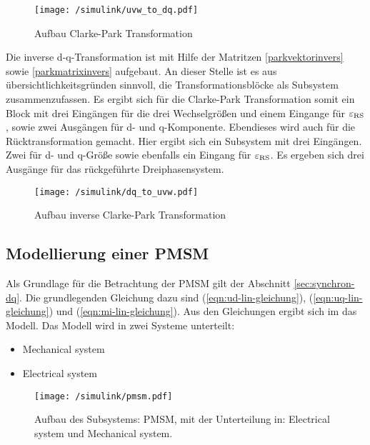 \begin{figure}[htb!]
	\centering
	\texttt{[image: /simulink/uvw\_to\_dq.pdf]}
	\label{fig:uvw_to_dq}
	\caption{Aufbau Clarke-Park Transformation}
\end{figure}

Die inverse d-q-Transformation ist mit Hilfe der Matritzen \ref{parkvektorinvers} sowie \ref{parkmatrixinvers} aufgebaut.
An dieser Stelle ist es aus übersichtlichkeitsgründen sinnvoll, die Transformationsblöcke als Subsystem zusammenzufassen.
Es ergibt sich für die Clarke-Park Transformation somit ein Block mit drei Eingängen für die drei Wechselgrößen und einem Eingange für $\varepsilon_{\mathrm{RS}}$, sowie zwei Ausgängen für d- und q-Komponente.
Ebendieses wird auch für die Rücktransformation gemacht. 
Hier ergibt sich ein Subsystem mit drei Eingängen. 
Zwei für d- und q-Größe sowie ebenfalls ein Eingang für $\varepsilon_{\mathrm{RS}}$.
Es ergeben sich drei Ausgänge für das rückgeführte Dreiphasensystem.

\begin{figure}[htb!]
	\centering
	\texttt{[image: /simulink/dq\_to\_uvw.pdf]}
	\label{fig:dq_to_uvw}
	\caption{Aufbau inverse Clarke-Park Transformation}
\end{figure}


\subsection{Modellierung einer PMSM}

Als Grundlage für die Betrachtung der PMSM gilt der Abschnitt \ref{sec:synchron-dq}.
Die grundlegenden Gleichung dazu sind (\ref{eqn:ud-lin-gleichung}), (\ref{eqn:uq-lin-gleichung}) und (\ref{eqn:mi-lin-gleichung}).
Aus den Gleichungen ergibt sich im  das Modell.
Das Modell wird in zwei Systeme unterteilt:

\begin{itemize}
	\item Mechanical system
	\item Electrical system
\end{itemize}

\begin{figure}[h!]
	\centering
	\texttt{[image: /simulink/pmsm.pdf]}
	\label{fig:pmsm}
	\caption{Aufbau des Subsystems: PMSM, mit der Unterteilung in: Electrical system und Mechanical system.}
\end{figure}


